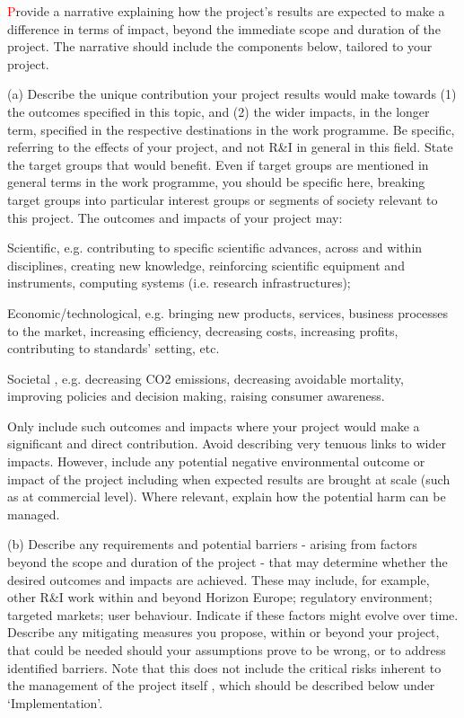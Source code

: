 \begin{draft}
{
\textcolor{red}
Provide a narrative explaining how the project’s results are expected to make a
difference in terms of impact, beyond the immediate scope and duration of the
project. The narrative should include the components below, tailored to your
project.

(a)	Describe the unique contribution your project results would make towards (1) the outcomes specified in this topic, and (2) the wider impacts, in the longer term, specified in the respective destinations in the work programme.
	Be specific, referring to the effects of your project, and not R\&I in general in this field.
	State the target groups that would benefit. Even if target groups are mentioned in general terms in the work programme, you should be specific here, breaking target groups into particular interest groups or segments of society relevant to this project.
	The outcomes and impacts of your project may:
  \begin{compactitem}


\item	Scientific, e.g. contributing to specific scientific advances, across and within disciplines, creating new knowledge, reinforcing scientific equipment and instruments,  computing systems (i.e. research infrastructures);
\item	Economic/technological, e.g. bringing new products, services, business processes to the market, increasing efficiency, decreasing costs, increasing profits, contributing to standards’ setting,  etc.
\item	Societal , e.g. decreasing CO2 emissions, decreasing avoidable mortality,
improving policies and decision making, raising consumer awareness.
\end{compactitem}
Only include such outcomes and impacts where your project would make a
significant and direct contribution. Avoid describing very tenuous links to
wider impacts. However, include any potential negative environmental outcome or
impact of the project including when expected results are brought at scale (such
as at commercial level). Where relevant, explain how the potential harm can be
managed.

(b)	Describe any requirements and potential barriers - arising from factors beyond the scope and duration of the project - that may determine whether the desired outcomes and impacts are achieved. These may include, for example, other R\&I work within and beyond Horizon Europe; regulatory environment; targeted markets; user behaviour. Indicate if these factors might evolve over time. Describe any mitigating measures you propose, within or beyond your project, that could be needed should your assumptions prove to be wrong, or to address identified barriers.
	Note that this does not include the critical risks inherent to the management
  of the project itself , which should be described below under
  ‘Implementation’.

}
\end{draft}
